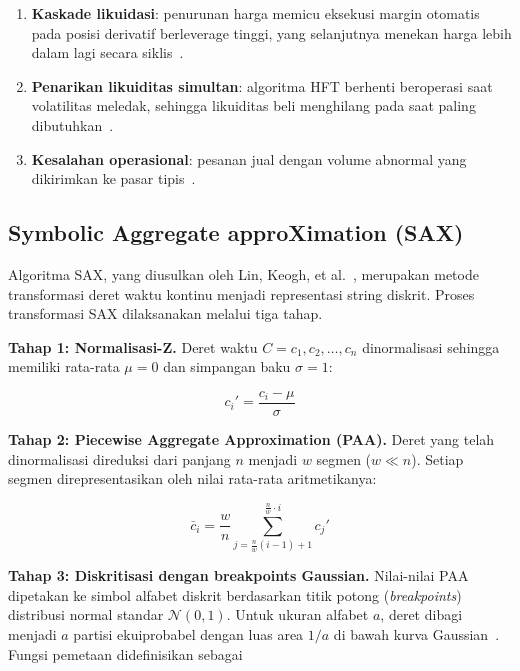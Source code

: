 \documentclass[conference]{IEEEtran}
\begin{document}
\begin{enumerate}
    \item \textbf{Kaskade likuidasi}: penurunan harga memicu eksekusi margin otomatis pada posisi derivatif berleverage tinggi, yang selanjutnya menekan harga lebih dalam lagi secara siklis~\cite{fsb2021}.
    \item \textbf{Penarikan likuiditas simultan}: algoritma HFT berhenti beroperasi saat volatilitas meledak, sehingga likuiditas beli menghilang pada saat paling dibutuhkan~\cite{easley2011}.
    \item \textbf{Kesalahan operasional}: pesanan jual dengan volume abnormal yang dikirimkan ke pasar tipis~\cite{kyle1985}.
\end{enumerate}

\subsection{Symbolic Aggregate approXimation (SAX)}

Algoritma SAX, yang diusulkan oleh Lin, Keogh, et al.~\cite{lin2007}, merupakan metode transformasi deret waktu kontinu menjadi representasi string diskrit. Proses transformasi SAX dilaksanakan melalui tiga tahap.

\textbf{Tahap 1: Normalisasi-Z.} Deret waktu $C = c_1, c_2, \ldots, c_n$ dinormalisasi sehingga memiliki rata-rata $\mu = 0$ dan simpangan baku $\sigma = 1$:

\begin{equation}
c_i' = \frac{c_i - \mu}{\sigma}
\label{eq:znorm}
\end{equation}

\textbf{Tahap 2: Piecewise Aggregate Approximation (PAA).} Deret yang telah dinormalisasi direduksi dari panjang $n$ menjadi $w$ segmen ($w \ll n$). Setiap segmen direpresentasikan oleh nilai rata-rata aritmetikanya:

\begin{equation}
\bar{c}_i = \frac{w}{n} \sum_{j=\frac{n}{w}(i-1)+1}^{\frac{n}{w} \cdot i} c_j'
\label{eq:paa}
\end{equation}

\textbf{Tahap 3: Diskritisasi dengan breakpoints Gaussian.} Nilai-nilai PAA dipetakan ke simbol alfabet diskrit berdasarkan titik potong (\textit{breakpoints}) distribusi normal standar $\mathcal{N}(0,1)$. Untuk ukuran alfabet $a$, deret dibagi menjadi $a$ partisi ekuiprobabel dengan luas area $1/a$ di bawah kurva Gaussian~\cite{lin2007}. Fungsi pemetaan didefinisikan sebagai
\end{document}
